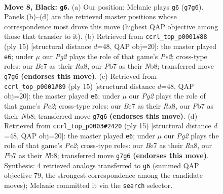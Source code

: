 \documentclass[11pt]{article}
\begin{document}
\begin{figure}[p]\centering
\begin{subfigure}{0.46\textwidth}\centering
\resizebox{\linewidth}{!}{%
\newchessgame
\chessboard[
  setfen={rnbq1rk1/ppp1bppp/4p3/3n4/2NP4/6P1/PP2PPBP/RNBQ1RK1 b - - 0 8},
  showmover=false,
  pgfstyle=straightmove, color=movearrow, markmove={g7-g6}
]}
\caption{}
\end{subfigure}\hfill
\begin{subfigure}{0.46\textwidth}\centering
\resizebox{\linewidth}{!}{%
\newchessgame
\chessboard[
  setfen={rnbq1rk1/pp2ppbp/5np1/3pN3/3P4/6P1/PP2PPBP/RNBQ1RK1 b - - 3 8},
  showmover=false,
  pgfstyle=straightmove, color=movearrow, markmove={e7-e6}
]}
\caption{}
\end{subfigure}
\\[4pt]
\begin{subfigure}{0.46\textwidth}\centering
\resizebox{\linewidth}{!}{%
\newchessgame
\chessboard[
  setfen={rnbq1rk1/pp2ppbp/5np1/3pN3/3P4/6P1/PP2PPBP/RNBQ1RK1 b - - 3 8},
  showmover=false,
  pgfstyle=straightmove, color=movearrow, markmove={e7-e6}
]}
\caption{}
\end{subfigure}\hfill
\begin{subfigure}{0.46\textwidth}\centering
\resizebox{\linewidth}{!}{%
\newchessgame
\chessboard[
  setfen={rnbq1rk1/pp2ppbp/5np1/3pN3/3P4/6P1/PP2PPBP/RNBQ1RK1 b - - 1 8},
  showmover=false,
  pgfstyle=straightmove, color=movearrow, markmove={e7-e6}
]}
\caption{}
\end{subfigure}
\caption{\textbf{Move 8, Black: \texttt{g6}.} (a) Our position; Melanie plays \texttt{g6} (\texttt{g7g6}). Panels (b)--(d) are the retrieved master positions whose correspondence most drove this move (highest QAP objective among those that transfer to it). (b) Retrieved from \texttt{ccrl\_top\_p0001\#88} (ply 15) [structural distance $d$=48, QAP obj=20]: the master played \texttt{e6}; under $\mu$ our \emph{Pg2} plays the role of that game's \emph{Pe2}; cross-type roles: our \emph{B}e7 as their \emph{R}a8, our \emph{P}b7 as their \emph{N}b8; transferred move \texttt{g7g6} \textbf{(endorses this move)}. (c) Retrieved from \texttt{ccrl\_top\_p0001\#89} (ply 15) [structural distance $d$=48, QAP obj=20]: the master played \texttt{e6}; under $\mu$ our \emph{Pg2} plays the role of that game's \emph{Pe2}; cross-type roles: our \emph{B}e7 as their \emph{R}a8, our \emph{P}b7 as their \emph{N}b8; transferred move \texttt{g7g6} \textbf{(endorses this move)}. (d) Retrieved from \texttt{ccrl\_top\_p0003\#2420} (ply 15) [structural distance $d$=48, QAP obj=20]: the master played \texttt{e6}; under $\mu$ our \emph{Pg2} plays the role of that game's \emph{Pe2}; cross-type roles: our \emph{B}e7 as their \emph{R}a8, our \emph{P}b7 as their \emph{N}b8; transferred move \texttt{g7g6} \textbf{(endorses this move)}. Synthesis: 4 retrieved analogs transferred to \texttt{g6} (summed QAP objective 79, the strongest correspondence among the candidate moves); Melanie committed it via the \texttt{search} selector.}
\label{fig:thought-m15}
\end{figure}
\end{document}
